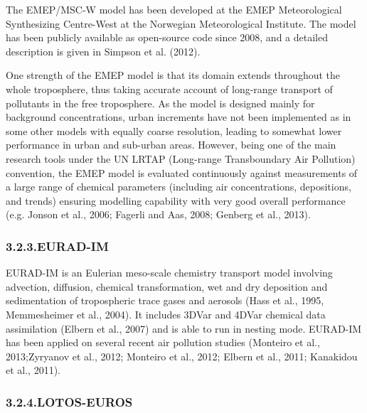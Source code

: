 \documentclass[9pt]{report}
\begin{document}
\noindent{}The EMEP/MSC-W model has been developed at the EMEP Meteorological Synthesizing Centre-West at the Norwegian Meteorological Institute. 
The model has been publicly available as open-source code since 2008, and a detailed description is given in Simpson et al. (2012).%

 One strength of the EMEP model is that its domain extends throughout the whole troposphere, thus taking accurate account of long-range transport of pollutants in the free troposphere. 
 As the model is designed mainly for background concentrations, urban increments have not been implemented as in some other models with equally coarse resolution, leading to somewhat lower performance in urban and sub-urban areas. 
 However, being one of the main research tools under the UN LRTAP (Long-range Transboundary Air Pollution) convention, the EMEP model is evaluated continuously against measurements of a large range of chemical parameters (including air concentrations, depositions, and trends) ensuring modelling capability with very good overall performance (e.g. Jonson et al., 2006; Fagerli and Aas, 2008; Genberg et al., 2013).%

\subsubsection{3.2.3.\hspace*{0.5em}EURAD-IM}\label{sec-eurad-im}%

\noindent{}EURAD-IM is an Eulerian meso-scale chemistry transport model involving advection, diffusion, chemical transformation, wet and dry deposition and sedimentation of tropospheric trace gases and aerosols (Hass et al., 1995, Memmesheimer et al., 2004). It includes 3DVar and 4DVar chemical data assimilation (Elbern et al., 2007) and is able to run in nesting mode.
EURAD-IM has been applied on several recent air pollution studies (Monteiro et al., 2013;Zyryanov et al., 2012; Monteiro et al., 2012; Elbern et al., 2011; Kanakidou et al., 2011).%

\subsubsection{3.2.4.\hspace*{0.5em}LOTOS-EUROS}\label{sec-lotos-euros}%
\end{document}

